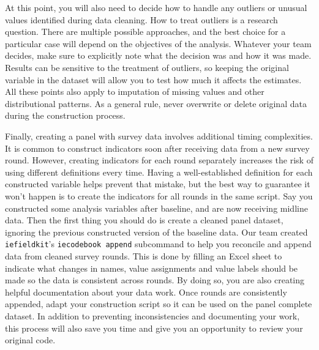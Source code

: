 At this point, you will also need to decide how to handle any outliers or unusual values identified during data cleaning. 
How to treat outliers is a research question.
There are multiple possible approaches, 
and the best choice for a particular case will depend on the objectives of the analysis.
Whatever your team decides, make sure to explicitly note what the decision was and how it was made.
Results can be sensitive to the treatment of outliers,
so keeping the original variable in the dataset will allow you to test how much it affects the estimates.
All these points also apply to imputation of missing values and other distributional patterns.
As a general rule, never overwrite or delete original data during the construction process.

Finally, creating a panel with survey data involves additional timing complexities.
It is common to construct indicators soon after receiving data from a new survey round.
However, creating indicators for each round separately increases the risk of using different definitions every time.
Having a well-established definition for each constructed variable helps prevent that mistake,
but the best way to guarantee it won't happen is to create the indicators for all rounds in the same script.
Say you constructed some analysis variables after baseline, and are now receiving midline data.
Then the first thing you should do is create a cleaned panel dataset,
ignoring the previous constructed version of the baseline data.
Our team created \texttt{iefieldkit}'s \texttt{iecodebook append} subcommand
to help you reconcile and append data from cleaned survey rounds.
This is done by filling an Excel sheet to indicate what changes in
names, value assignments and value labels should be made so the data is consistent across rounds.
By doing so, you are also creating helpful documentation about your data work.
Once rounds are consistently appended, 
adapt your construction script so it can be used on the panel complete dataset.
In addition to preventing inconsistencies and documenting your work,
this process will also save you time and give you an opportunity to review your original code.


